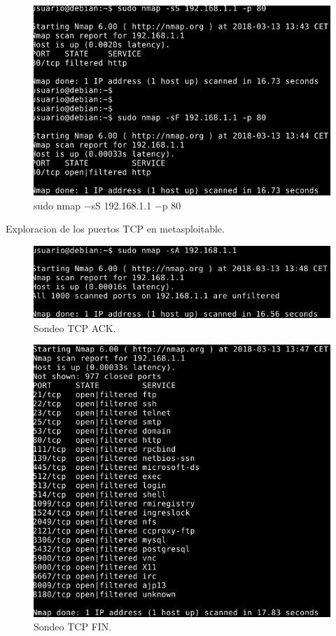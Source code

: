 \documentclass[11pt]{article}
\begin{document}
      \begin{figure}[H]
        \centering
        \includegraphics[width = .9\textwidth]{sondeo10}
        \caption{sudo nmap $-$sS 192.168.1.1 $-$p 80}
      \end{figure}

      \newpage
      \par
      Exploracion de los puertos TCP en metasploitable.

      \begin{figure}[H]
        \centering
        \includegraphics[width = \textwidth]{sondeo12}
        \caption{Sondeo TCP ACK.}
      \end{figure}

      \begin{figure}[H]
        \centering
        \includegraphics[width = \textwidth]{sondeo11}
        \caption{Sondeo TCP FIN.}
      \end{figure}
\end{document}
